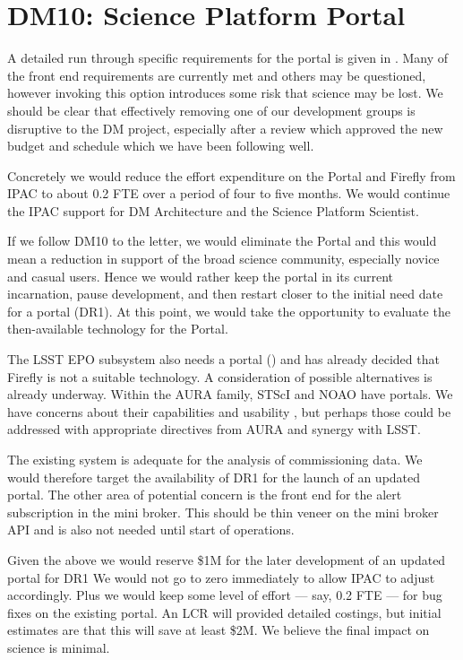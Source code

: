 \section{DM10: Science Platform Portal}\label{sect:dm10}

A detailed run through specific requirements for the portal is given in .
Many of the front end requirements are currently met and others may be questioned, however invoking this option introduces some risk that science may be lost.
We should be clear that effectively removing one of our development groups is disruptive to the DM project,
 especially after a
review which approved the new budget and schedule which we have been following well.

Concretely we would reduce the effort expenditure on the Portal and Firefly from IPAC to about 0.2 FTE over a period of four to five months.
We would continue the IPAC support for DM Architecture and the Science Platform Scientist.

If we follow DM10 to the letter, we would eliminate the Portal and this would mean a reduction in support of the broad science community,
especially novice and casual users.
Hence we would rather keep the portal in its current incarnation, pause development, and then restart closer
to the initial need date for a portal (DR1).
At this point, we would take the opportunity to evaluate the then-available technology for the Portal.

The LSST EPO subsystem also needs a portal ()  and has already decided that
Firefly is not a suitable technology. A consideration of possible alternatives
is already underway.
Within the AURA family, STScI and NOAO have portals.
We have concerns about their capabilities and usability
,
but perhaps those could be addressed with appropriate directives from AURA and synergy with LSST.

The existing system is adequate for the analysis of commissioning data.
We would therefore target the availability of DR1 for the launch of an updated
portal.
The other area of potential concern is the front end for the alert subscription in the mini broker.
This should be  thin veneer on the mini broker API and is also not needed until start of operations.

Given the above we would reserve \$1M for the later development of an updated portal for DR1
We would not go to zero immediately to allow IPAC to adjust accordingly.
Plus we would keep some level of effort --- say, 0.2 FTE --- for bug fixes on the existing portal.
An LCR will provided detailed costings, but initial estimates are that this will save at least \$2M.
We believe the final impact on science is minimal.


